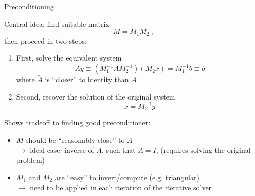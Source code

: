 \documentclass[handout,usepdftitle=false,xcolor=dvipsnames,aspectratio=169]{beamer}
\begin{document}
\begin{frame}{Preconditioning}
  \begin{witemize}
    \item Central idea: find suitable matrix
    \begin{equation}
      M=M_1M_2 \: ,
    \end{equation}
    then proceed in two steps:
    \begin{enumerate}
      \item First, solve the equivalent system 
      \begin{equation}
        \tilde A y \equiv (M_1^{-1}AM_2^{-1}) (M_2x)=M_1^{-1}b\equiv \tilde b 
      \end{equation}
      where $\tilde A$ is “closer” to identity than $A$
      \item Second, recover the solution of the original system
      \begin{equation}
       x=M_2^{-1}y
      \end{equation}
    \end{enumerate}\vspace{-1cm}
    \item Shows tradeoff to finding good preconditioner: 
    \begin{itemize}
      \item $M$ should be “reasonably close” to $A$\\
      $\rightarrow$ ideal case: inverse of $A$, such that $\tilde A=I$, (requires solving the original problem)
      \item $M_1$ and $M_2$ are “easy” to invert/compute (e.g. triangular)\\
      $\rightarrow$ need to be applied in each iteration of the iterative solver
    \end{itemize}
  \end{witemize}
\end{frame}
\end{document}
